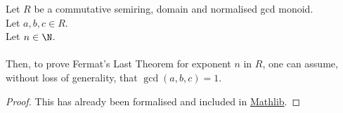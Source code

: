 \begin{lemma}
  \label{lmm:fermatLastTheoremWith_of_fermatLastTheoremWith_coprime}
  \leanok
  Let $R$ be a commutative semiring, domain and normalised gcd monoid.\\%
  Let $a, b, c \in R$. \\
  Let $n \in \N$. \\\\
  Then, to prove Fermat's Last Theorem for exponent $n$ in $R$,
  one can assume, without loss of generality, that $\gcd(a,b,c)=1$.
\end{lemma}
\begin{proof}
  \leanok
  This has already been formalised and included in \href{https://pitmonticone.github.io/FLT3/docs/FLT3/Mathlib/NumberTheory/FLT/Basic.html#fermatLastTheoremWith_of_fermatLastTheoremWith_coprime}{Mathlib}.
\end{proof}

